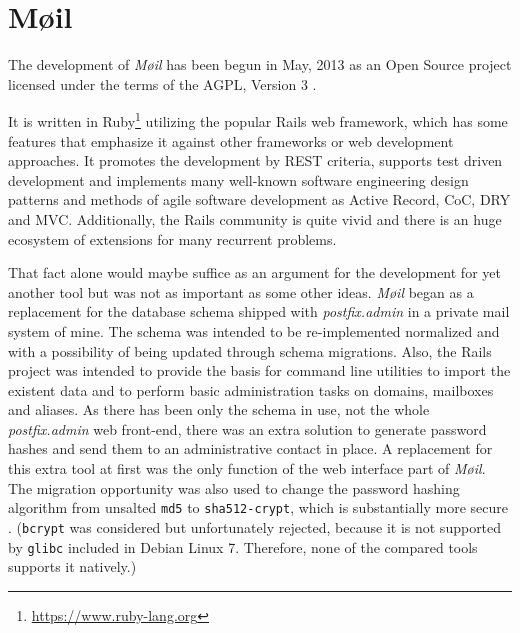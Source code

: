 \documentclass[12pt,a4paper]{scrartcl}
\begin{document}
	\section{Møil}
	\label{sec:moeil}
		The development of \emph{Møil} has been begun in May, 2013 as an Open
		Source project licensed under the terms of the AGPL, Version 3
		\cite{agpl}.

		
		It is written in Ruby\footnote{\url{https://www.ruby-lang.org}}
		utilizing the popular \ac{Rails} web framework, which has some features
		that emphasize it against other frameworks or web development
		approaches. It promotes the development by \acs{REST} \cite{rest}
		criteria, supports test driven development and implements many
		well-known software engineering design patterns and methods of agile
		software development as Active Record, \ac{CoC}, \ac{DRY} and \ac{MVC}.
		Additionally, the \ac{Rails} community is quite vivid and there is an
		huge ecosystem of extensions for many recurrent problems.
		\s


		That fact alone would maybe suffice as an argument for the development
		for yet another tool but was not as important as some other ideas.
		\emph{Møil} began as a replacement for the database schema shipped with
		\emph{postfix.admin} in a private mail system of mine. The schema was
		intended to be re-implemented normalized \cite{dbnorm} and with a
		possibility of being updated through schema migrations. Also, the
		\ac{Rails} project was intended to provide the basis for command line
		utilities to import the existent data and to perform basic
		administration tasks on domains, mailboxes and aliases. As there has
		been only the schema in use, not the whole \emph{postfix.admin} web
		front-end, there was an extra solution to generate password hashes and
		send them to an administrative contact in place. A replacement for this
		extra tool at first was the only function of the web interface part of
		\emph{Møil}. The migration opportunity was also used to change the
		password hashing algorithm from unsalted \texttt{md5} to
		\texttt{sha512-crypt}, which is substantially more secure
		\cite{missing}. (\texttt{bcrypt} was considered but unfortunately
		rejected, because it is not supported by \texttt{glibc} included in
		Debian Linux 7. Therefore, none of the compared tools supports it
		natively.)
\end{document}
